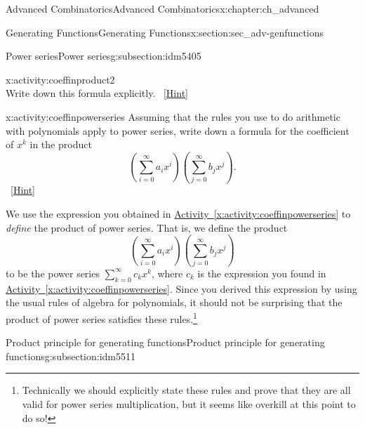 \documentclass[oneside,10pt,]{book}
\numberwithin{equation}{chapter}
\begin{document}
\begin{chapterptx}{Advanced Combinatorics}{}{Advanced Combinatorics}{}{}{x:chapter:ch_advanced}
\begin{sectionptx}{Generating Functions}{}{Generating Functions}{}{}{x:section:sec_adv-genfunctions}
\begin{subsectionptx}{Power series}{}{Power series}{}{}{g:subsection:idm5405}
\begin{activity}{}{x:activity:coeffinproduct2}
\begin{equation*}
\end{equation*}
Write down this formula explicitly.%
\qquad~\hfill{\tiny\hyperlink{g:hint:idm5481-back}{[Hint]}}\end{activity}
\begin{activity}{}{x:activity:coeffinpowerseries}%
Assuming that the rules you use to do arithmetic with polynomials apply to power series, write down a formula for the coefficient of \(x^k\) in the product%
\begin{equation*}
\left(\sum_{i=0}^\infty a_ix^i\right)\left(\sum_{j=0}^\infty
b_jx^j\right)\text{.}
\end{equation*}
%
\qquad~\hfill{\tiny\hyperlink{g:hint:idm5496-back}{[Hint]}}\end{activity}
We use the expression you obtained in \hyperref[x:activity:coeffinpowerseries]{Activity~\ref{x:activity:coeffinpowerseries}} to \emph{define} the product of power series. That is, we define the product%
\begin{equation*}
\left(\sum_{i=0}^\infty a_ix^i\right)\left(\sum_{j=0}^\infty
b_jx^j\right)
\end{equation*}
to be the power series \(\sum_{k=0}^\infty c_k x^k\), where \(c_k\) is the expression you found in \hyperref[x:activity:coeffinpowerseries]{Activity~\ref{x:activity:coeffinpowerseries}}. Since you derived this expression by using the usual rules of algebra for polynomials, it should not be surprising that the product of power series satisfies these rules.\footnote{Technically we should explicitly state these rules and prove that they are all valid for power series multiplication, but it seems like overkill at this point to do so!\label{g:fn:idm5510}}%
\end{subsectionptx}
%
%
\typeout{************************************************}
\typeout{************************************************}
%
\begin{subsectionptx}{Product principle for generating functions}{}{Product principle for generating functions}{}{}{g:subsection:idm5511}

\end{subsectionptx}
\end{sectionptx}
\end{chapterptx}
\end{document}
